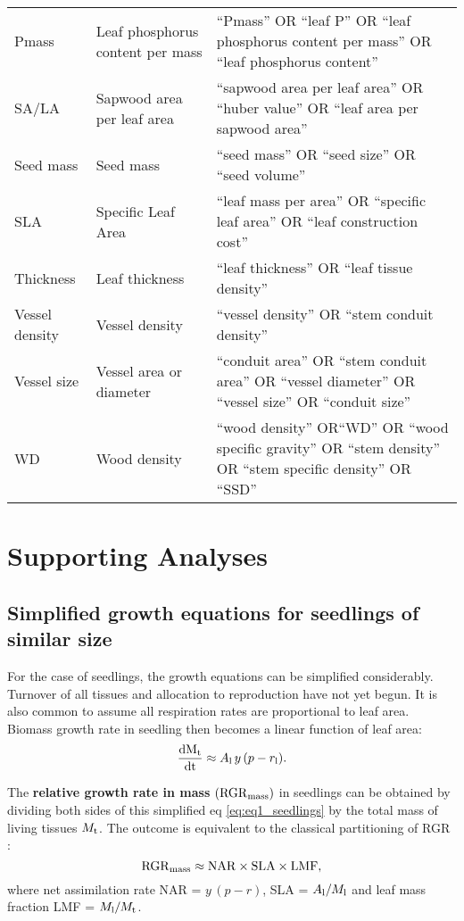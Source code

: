 \documentclass[10pt,twoside]{article}\usepackage[]{graphicx}\usepackage[]{color}
\begin{document}
\begin{table}[h!]
{\begin{tabular}{p{3cm}p{3cm}p{8cm}}
  Pmass & Leaf phosphorus content per mass & ``Pmass'' OR ``leaf P'' OR  ``leaf phosphorus content per mass'' OR ``leaf phosphorus content'' \\
  SA/LA & Sapwood area per leaf area & ``sapwood area per leaf area'' OR ``huber value'' OR ``leaf area per sapwood area'' \\
  Seed mass & Seed mass & ``seed mass'' OR ``seed size'' OR ``seed volume'' \\
  SLA & Specific Leaf Area & ``leaf mass per area'' OR ``specific leaf area'' OR ``leaf construction cost'' \\
  Thickness & Leaf thickness & ``leaf thickness''  OR ``leaf tissue density'' \\
  Vessel density & Vessel density & ``vessel density'' OR ``stem conduit density'' \\
  Vessel size & Vessel area or diameter & ``conduit area'' OR ``stem conduit area'' OR ``vessel diameter'' OR ``vessel size'' OR ``conduit size''   \\
  WD & Wood density & ``wood density'' OR``WD'' OR ``wood specific gravity'' OR ``stem density'' OR ``stem specific density'' OR ``SSD'' \\
   \hline
\end{tabular}
}
\end{table}

\clearpage

\section{Supporting Analyses}\label{app:supp_info_analyses}

\subsection{Simplified growth equations for seedlings of similar size}\label{app:growth-equation}

For the case of seedlings, the growth equations can be simplified considerably. Turnover of all tissues and allocation to reproduction have not yet begun. It is also common to assume all respiration rates are proportional to leaf area. Biomass growth rate in seedling then becomes a linear function of leaf area:
\begin{equation}\label{eq:eq1_seedlings}
{\frac{\ensuremath{\rm{d}}M_{\rm t}}{\ensuremath{\rm{d}}t}}  \approx  A_{\rm l} \, y \, (p - r_{\rm l}).
\end{equation}

The \textbf{relative growth rate in mass} $({\rm RGR}_{{\rm mass}})$ in seedlings can be obtained by dividing both sides of this simplified eq \ref{eq:eq1_seedlings} by the total mass of living tissues $M_{\rm t}$. The outcome is equivalent to the classical partitioning of RGR \citep{Lambers:1992bj, Cornelissen:1998ta}:
\begin{equation}\label{eq:eq1_seedlings_RGR}
{\rm RGR}_{{\rm mass}}  \approx {\rm NAR} \times  {\rm SLA} \times  {\rm LMF},
\end{equation}
where net assimilation rate NAR = $y \, (p - r)$, SLA = $A_{\rm l}/ M_{\rm l}$ and leaf mass fraction LMF = $M_{\rm l}/ M_{\rm t}$.
\end{document}
